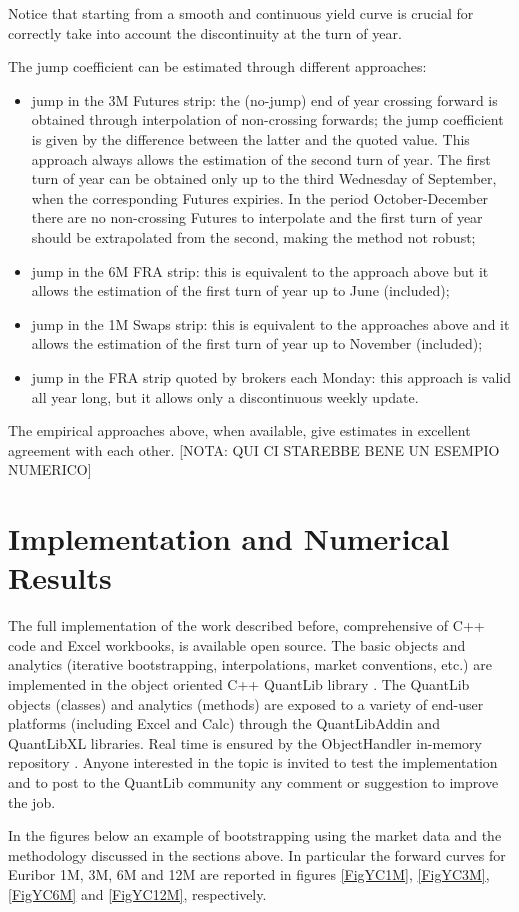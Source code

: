 \documentclass[11pt,reqno]{amsart}
\begin{document}
Notice that starting from a smooth and continuous yield curve is crucial for correctly take into account the discontinuity at the turn of year.
\par
The jump coefficient can be estimated through different approaches:
\begin{itemize}
  \item jump in the 3M Futures strip: the (no-jump) end of year crossing forward is obtained through interpolation of non-crossing forwards; the jump coefficient is given by the difference between the latter and the quoted value. This approach always allows the estimation of the second turn of year. The first turn of year can be obtained only up to the third Wednesday of September, when the corresponding Futures expiries. In the period October-December there are no non-crossing Futures to interpolate and the first turn of year should be extrapolated from the second, making the method not robust;
  \item jump in the 6M FRA strip: this is equivalent to the approach above but it allows the estimation of the first turn of year up to June (included);
  \item jump in the 1M Swaps strip: this is equivalent to the approaches above and it allows the estimation of the first turn of year up to November (included);
  \item jump in the FRA strip quoted by brokers each Monday: this approach is valid all year long, but it allows only a discontinuous weekly update.
\end{itemize}
The empirical approaches above, when available, give estimates in excellent agreement with each other.
[NOTA: QUI CI STAREBBE BENE UN ESEMPIO NUMERICO]

\section{Implementation and Numerical Results}
\label{sec:ImplementResults}
The full implementation of the work described before, comprehensive of C++ code and Excel workbooks, is available open source. The basic objects and analytics (iterative bootstrapping, interpolations, market conventions, etc.) are implemented in the object oriented C++ QuantLib library \cite{QuantLib}. The QuantLib objects (classes) and analytics (methods) are exposed to a variety of end-user platforms (including Excel and Calc) through the QuantLibAddin \cite{QuantLibAddin} and QuantLibXL \cite{QuantLibXL} libraries. Real time is ensured by the ObjectHandler in-memory repository \cite{ObjectHandler}.
Anyone interested in the topic is invited to test the implementation and to post to the QuantLib community any comment or suggestion to improve the job.
\par
In the figures below an example of bootstrapping using the market data and the methodology discussed in the sections above. In particular the forward curves for Euribor 1M, 3M, 6M and 12M are reported in figures \ref{FigYC1M}, \ref{FigYC3M}, \ref{FigYC6M} and \ref{FigYC12M}, respectively.
\end{document}
